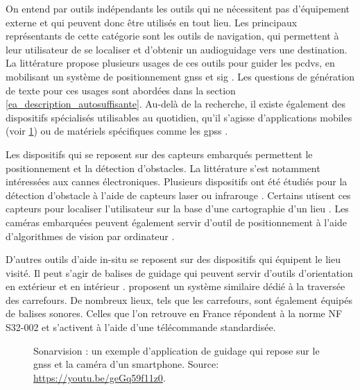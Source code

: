On entend par outils indépendants les outils qui ne nécessitent pas d'équipement externe et qui peuvent donc être utilisés en tout lieu. Les principaux représentants de cette catégorie sont les outils de navigation, qui permettent à leur utilisateur de se localiser et d'obtenir un audioguidage vers une destination. La littérature propose plusieurs usages de ces outils pour guider les \glspl{pcdv}, en mobilisant un système de positionnement \gls{gnss} et \gls{sig} \cite{Golledge1998}. Les questions de génération de texte pour ces usages sont abordées dans la section \ref{ea_description_autosuffisante}. Au-delà de la recherche, il existe également des dispositifs spécialisés utilisables au quotidien, qu'il s'agisse d'applications mobiles (voir \ref{fig:dispositif_in_situ}) ou de matériels spécifiques comme les \glspl{gps} \cite{Refuveille2012}. 

Les dispositifs qui se reposent sur des capteurs embarqués permettent le positionnement et la détection d'obstacles. La littérature s'est notamment intéressées aux cannes électroniques. Plusieurs dispositifs ont été étudiés pour la détection d'obstacle à l'aide de capteurs laser ou infrarouge \cite{Damaschini2005}. Certains utisent ces capteurs pour localiser l'utilisateur sur la base d'une cartographie d'un lieu \cite{Connier2018}. Les caméras embarquées peuvent également servir d'outil de positionnement à l'aide d'algorithmes de vision par ordinateur \cite{Duh2021}.

\newpar{}

D'autres outils d'aide in-situ se reposent sur des dispositifs qui équipent le lieu visité. Il peut s'agir de balises de guidage qui peuvent servir d'outils d'orientation en extérieur et en intérieur \cite{Ahmetovic2016, Cheraghi2017}. \cite{Shin2022} proposent un système similaire dédié à la traversée des carrefours. De nombreux lieux, tels que les carrefours, sont également équipés de balises sonores. Celles que l'on retrouve en France répondent à la norme NF S32-002 \cite{NFS32002_2004} et s'activent à l'aide d'une télécommande standardisée.

\begin{figure}
    \centering
    \caption{Sonarvision : un exemple d'application de guidage qui repose sur le \gls{gnss} et la caméra d'un smartphone. Source: \url{https://youtu.be/geGq59f11z0}.}
    \label{fig:dispositif_in_situ}
\end{figure}

